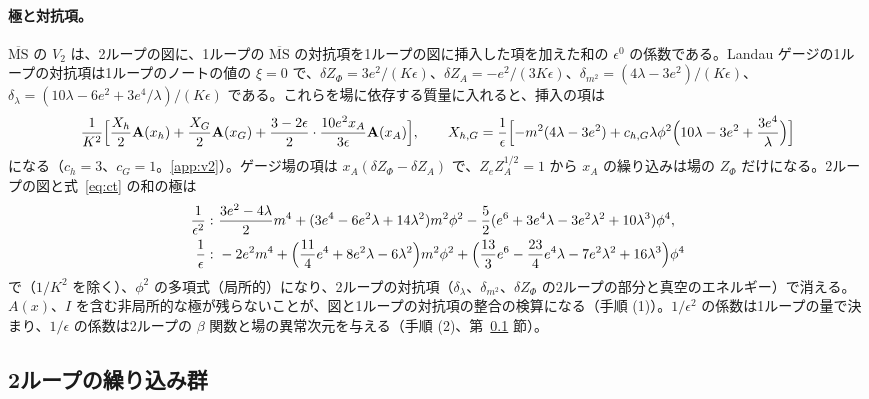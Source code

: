 \documentclass[a4paper,10pt]{ltjsarticle}
\newcommand{\MSbar}{\overline{\mathrm{MS}}}
\begin{document}
\paragraph{極と対抗項。}$\MSbar$ の $V_2$ は、2ループの図に、1ループの $\MSbar$ の対抗項を1ループの図に挿入した項を加えた和の $\epsilon^0$ の係数である。Landau ゲージの1ループの対抗項は1ループのノートの値の $\xi=0$ で、$\delta Z_\Phi=3e^2/(K\epsilon)$、$\delta Z_A=-e^2/(3K\epsilon)$、$\delta_{m^2}=(4\lambda-3e^2)/(K\epsilon)$、$\delta_\lambda=(10\lambda-6e^2+3e^4/\lambda)/(K\epsilon)$ である。これらを場に依存する質量に入れると、挿入の項は
\begin{equation}
\frac1{K^2}\Bigl[\frac{X_h}2\mathbf A(x_h)+\frac{X_G}2\mathbf A(x_G)+\frac{3-2\epsilon}2\cdot\frac{10e^2x_A}{3\epsilon}\mathbf A(x_A)\Bigr],\qquad
X_{h,G}=\frac1\epsilon\Bigl[-m^2(4\lambda-3e^2)+c_{h,G}\lambda\phi^2\Bigl(10\lambda-3e^2+\frac{3e^4}\lambda\Bigr)\Bigr]
\label{eq:ct}
\end{equation}
になる（$c_h=3$、$c_G=1$。\ref{app:v2}）。ゲージ場の項は $x_A(\delta Z_\Phi-\delta Z_A)$ で、$Z_eZ_A^{1/2}=1$ から $x_A$ の繰り込みは場の $Z_\Phi$ だけになる。2ループの図と式~\eqref{eq:ct} の和の極は
\begin{equation}
\begin{aligned}
\frac1{\epsilon^2}:\ &\frac{3e^2-4\lambda}2m^4+(3e^4-6e^2\lambda+14\lambda^2)m^2\phi^2-\frac52(e^6+3e^4\lambda-3e^2\lambda^2+10\lambda^3)\phi^4,\\
\frac1\epsilon:\ &-2e^2m^4+\Bigl(\frac{11}4e^4+8e^2\lambda-6\lambda^2\Bigr)m^2\phi^2+\Bigl(\frac{13}3e^6-\frac{23}4e^4\lambda-7e^2\lambda^2+16\lambda^3\Bigr)\phi^4
\end{aligned}
\label{eq:poles}
\end{equation}
で（$1/K^2$ を除く）、$\phi^2$ の多項式（局所的）になり、2ループの対抗項（$\delta_\lambda$、$\delta_{m^2}$、$\delta Z_\Phi$ の2ループの部分と真空のエネルギー）で消える。$A(x)$、$I$ を含む非局所的な極が残らないことが、図と1ループの対抗項の整合の検算になる（手順 (1)）。$1/\epsilon^2$ の係数は1ループの量で決まり、$1/\epsilon$ の係数は2ループの $\beta$ 関数と場の異常次元を与える（手順 (2)、第~\ref{sec:rg} 節）。

\subsection{2ループの繰り込み群}\label{sec:rg}
\end{document}
